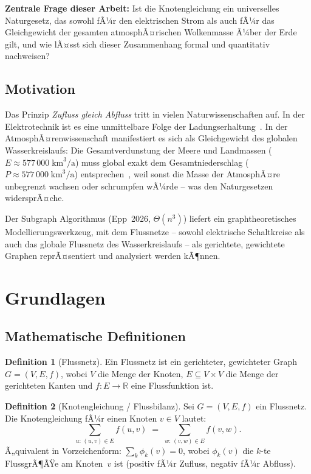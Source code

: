 ﻿\documentclass[a4paper,12pt]{article}
\theoremstyle{definition}
\newtheorem{definition}{Definition}
\begin{document}
\textbf{Zentrale Frage dieser Arbeit:} Ist die Knotengleichung ein universelles
Naturgesetz, das sowohl fÃ¼r den elektrischen Strom als auch fÃ¼r das Gleichgewicht
der gesamten atmosphÃ¤rischen Wolkenmasse Ã¼ber der Erde gilt, und wie lÃ¤sst sich
dieser Zusammenhang formal und quantitativ nachweisen?

\subsection{Motivation}

Das Prinzip \emph{Zufluss gleich Abfluss} tritt in vielen Naturwissen\-schaften
auf. In der Elektrotechnik ist es eine unmittelbare Folge der
Ladungserhaltung~\cite{kirchhoff1845}. In der AtmosphÃ¤ren\-wissenschaft
manifestiert es sich als Gleichgewicht des globalen Wasserkreislaufs: Die
Gesamtverdunstung der Meere und Landmassen ($E \approx 577\,000\;\text{km}^3/\text{a}$)
muss global exakt dem Gesamtniederschlag ($P \approx 577\,000\;\text{km}^3/\text{a}$)
entsprechen~\cite{trenberth2011}, weil sonst die Masse der AtmosphÃ¤re
unbegrenzt wachsen oder schrumpfen wÃ¼rde -- was den Naturgesetzen widersprÃ¤che.

Der Subgraph Algorithmus (Epp~2026, $\Theta(n^3)$) \cite{epp2026} liefert
ein graphtheoretisches Modellierungs\-werkzeug, mit dem Flussnetze -- sowohl
elektrische Schaltkreise als auch das globale Flussnetz des Wasser\-kreislaufs
-- als gerichtete, gewichtete Graphen reprÃ¤sentiert und analysiert werden kÃ¶nnen.

\section{Grundlagen}

\subsection{Mathematische Definitionen}

\begin{definition}[Flussnetz]
  Ein Flussnetz ist ein gerichteter, gewichteter Graph $G = (V, E, f)$, wobei
  $V$ die Menge der Knoten, $E \subseteq V \times V$ die Menge der gerichteten
  Kanten und $f: E \to \mathbb{R}$ eine Flussfunktion ist.
\end{definition}

\begin{definition}[Knotengleichung / Flussbilanz]
  \label{def:knotengleichung}
  Sei $G = (V, E, f)$ ein Flussnetz. Die Knotengleichung fÃ¼r einen Knoten
  $v \in V$ lautet:
  \[
    \sum_{u:\,(u,v)\in E} f(u,v) \;=\; \sum_{w:\,(v,w)\in E} f(v,w).
  \]
  Ã„quivalent in Vorzeichenform: $\displaystyle\sum_{k} \phi_k(v) = 0$, wobei
  $\phi_k(v)$ die $k$-te FlussgrÃ¶ÃŸe am Knoten~$v$ ist
  (positiv fÃ¼r Zufluss, negativ fÃ¼r Abfluss).
\end{definition}
\end{document}
